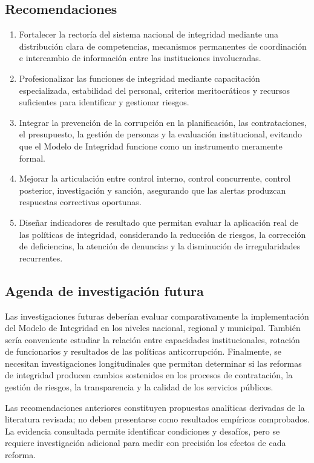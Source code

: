 \documentclass[Afour,sageh,times]{sagej}
\begin{document}
\subsection*{Recomendaciones}

\begin{enumerate}
\item Fortalecer la rectoría del sistema nacional de integridad mediante una distribución clara de competencias, mecanismos permanentes de coordinación e intercambio de información entre las instituciones involucradas.

\item Profesionalizar las funciones de integridad mediante capacitación especializada, estabilidad del personal, criterios meritocráticos y recursos suficientes para identificar y gestionar riesgos.

\item Integrar la prevención de la corrupción en la planificación, las contrataciones, el presupuesto, la gestión de personas y la evaluación institucional, evitando que el Modelo de Integridad funcione como un instrumento meramente formal.

\item Mejorar la articulación entre control interno, control concurrente, control posterior, investigación y sanción, asegurando que las alertas produzcan respuestas correctivas oportunas.

\item Diseñar indicadores de resultado que permitan evaluar la aplicación real de las políticas de integridad, considerando la reducción de riesgos, la corrección de deficiencias, la atención de denuncias y la disminución de irregularidades recurrentes.
\end{enumerate}

\subsection*{Agenda de investigación futura}

Las investigaciones futuras deberían evaluar comparativamente la implementación del Modelo de Integridad en los niveles nacional, regional y municipal. También sería conveniente estudiar la relación entre capacidades institucionales, rotación de funcionarios y resultados de las políticas anticorrupción. Finalmente, se necesitan investigaciones longitudinales que permitan determinar si las reformas de integridad producen cambios sostenidos en los procesos de contratación, la gestión de riesgos, la transparencia y la calidad de los servicios públicos.

Las recomendaciones anteriores constituyen propuestas analíticas derivadas de la literatura revisada; no deben presentarse como resultados empíricos comprobados. La evidencia consultada permite identificar condiciones y desafíos, pero se requiere investigación adicional para medir con precisión los efectos de cada reforma.



\end{document}
